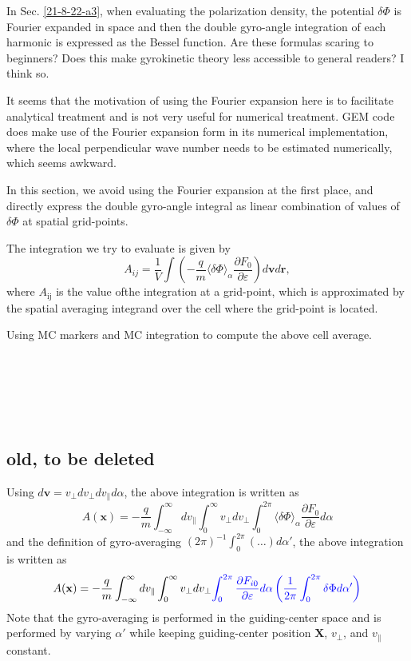 \documentclass{llncs}
\newcommand{\tmcolor}[2]{{\color{#1}{#2}}}
\newcommand{\tmop}[1]{\ensuremath{\operatorname{#1}}}
\begin{document}
In Sec. \ref{21-8-22-a3}, when evaluating the polarization density, the
potential $\delta \Phi$ is Fourier expanded in space and then the double
gyro-angle integration of each harmonic is expressed as the Bessel function.
Are these formulas scaring to beginners? Does this make gyrokinetic theory
less accessible to general readers? I think so.

It seems that the motivation of using the Fourier expansion here is to
facilitate analytical treatment and is not very useful for numerical
treatment. GEM code does make use of the Fourier expansion form in its
numerical implementation, where the local perpendicular wave number needs to
be estimated numerically, which seems awkward.

In this section, we avoid using the Fourier expansion at the first place, and
directly express the double gyro-angle integral as linear combination of
values of $\delta \Phi$ at spatial grid-points.

The integration we try to evaluate is given by
\begin{equation}
  A_{i j} = \frac{1}{V} \int \left( - \frac{q}{m} \langle \delta \Phi
  \rangle_{\alpha} \frac{\partial F_0}{\partial \varepsilon} \right)
  d\mathbf{v}d\mathbf{r},
\end{equation}
where $A_{\tmop{ij}}$ is the value of\quad the integration at a grid-point,
which is approximated by the spatial averaging integrand over the cell where
the grid-point is located.

Using MC markers and MC integration to compute the above cell average.

\

\

\

\subsection{old, to be deleted}

Using $d \mathbf{v} = v_{\perp} d v_{\perp} d v_{\parallel} d \alpha$, the
above integration is written as
\begin{equation}
  A (\mathbf{x}) = - \frac{q}{m} \int_{- \infty}^{\infty} d v_{\parallel}
  \int_0^{\infty} v_{\perp} d v_{\perp} \int_0^{2 \pi} \langle \delta \Phi
  \rangle_{\alpha} \frac{\partial F_0}{\partial \varepsilon} d \alpha
\end{equation}
and the definition of gyro-averaging $(2 \pi)^{- 1} \int_0^{2 \pi} (\ldots) d
\alpha'$, the above integration is written as
\begin{equation}
  \label{21-8-22-e1} A (\mathbf{x}) = - \frac{q}{m} \int_{- \infty}^{\infty} d
  v_{\parallel} \int_0^{\infty} v_{\perp} d v_{\perp} \tmcolor{blue}{\int_0^{2
  \pi} \frac{\partial F_{i 0}}{\partial \varepsilon} d \alpha \left(
  \frac{1}{2 \pi} \int_0^{2 \pi} \delta \Phi d \alpha' \right)}
\end{equation}
Note that the gyro-averaging is performed in the guiding-center space and is
performed by varying $\alpha'$ while keeping guiding-center position
$\mathbf{X}$, $v_{\perp}$, and $v_{\parallel}$ constant.
\end{document}
